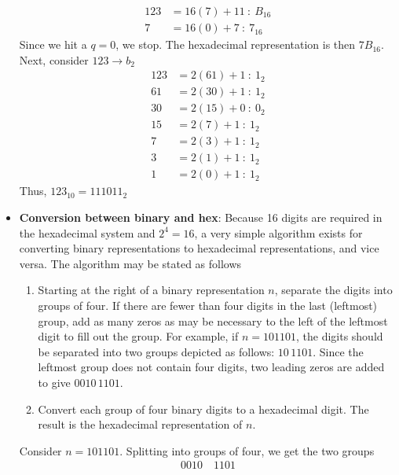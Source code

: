 \documentclass{report}
\begin{document}
\begin{itemize}
            \begin{align*}
                123 &= 16(7) + 11 \ : \ B_{16}\\
                7&= 16(0) + 7 \ : \ 7_{16}
            \end{align*}
            Since we hit a $q=0$, we stop. The hexadecimal representation is then $7B_{16}$. Next, consider $123 \to b_{2} $
            \begin{align*}
                123 &= 2(61) + 1 \ :\ 1_{2} \\
                61 &=2(30) + 1 \ : \ 1_{2} \\
                30 &= 2(15) + 0 \ : \ 0_{2} \\
                15 &= 2(7) + 1 \ : \ 1_{2} \\
                7 &= 2(3) + 1 \ : \ 1_{2} \\
                3&= 2(1) + 1 \ : \ 1_{2} \\
                1 &= 2(0) + 1 \ : \ 1_{2}
            \end{align*}
            Thus, $123_{10} = 111011_{2}$
        \item \textbf{Conversion between binary and hex}: Because 16 digits are required in the hexadecimal system and $2^{4} = 16$, a very simple algorithm exists for converting binary representations to hexadecimal representations, and vice versa.
            \bigbreak \noindent 
            The algorithm may be stated as follows
            \begin{enumerate}
                \item Starting at the right of a binary representation \(n\), separate the digits into groups of four. If there are fewer than four digits in the last (leftmost) group, add as many zeros as may be necessary to the left of the leftmost digit to fill out the group. For example, if \(n = 101101\), the digits should be separated into two groups depicted as follows: \(10 \, 1101\). Since the leftmost group does not contain four digits, two leading zeros are added to give \(0010 \, 1101\).
                \item Convert each group of four binary digits to a hexadecimal digit. The result is the hexadecimal representation of \(n\).
            \end{enumerate}
            Consider $n=101101$. Splitting into groups of four, we get the two groups
            \begin{align*}
                0010 \quad 1101
            \end{align*}

\end{itemize}
\end{document}
